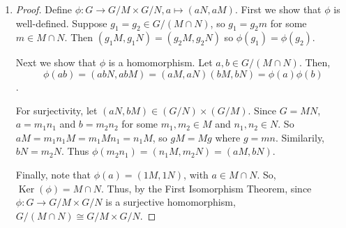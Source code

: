 \documentclass[11pt, letterpaper]{article}
\begin{document}
\begin{enumerate}
\begin{proof}
    we have $\vert HM = k \vert K \vert$ for some positive integer $k$, so either $\vert G : HM \vert = p$ or $\vert G : HM \vert = 1$. If it is $p$ then from 7, $\vert H = \vert H \cap M \vert$, so $H \leq M$. If instead it is $1$, then $\vert HM \vert = \vert G \vert$, so $HM = G$ and $\vert HM \vert = p \vert M \vert$. So
    $
    \vert HM \vert = \vert H : H \cap M \vert \vert K \vert
    $
    and $\vert H : H \cap M \vert = p$.
  \end{proof}

  \item \begin{proof}
    Define $\phi: G \to G/M \times G/N, a \mapsto (aN, aM)$. First we show that $\phi$ is well-defined. Suppose $g_1 = g_2 \in G/(M \cap N)$, so $g_1 = g_2m$ for some $m \in M \cap N$. Then $(g_1M, g_1N) = (g_2M, g_2N)$ so $\phi(g_1) = \phi(g_2)$.

    Next we show that $\phi$ is a homomorphism. Let $a, b \in G/(M \cap N)$. Then,
    $$
    \phi(ab) = (abN, abM) = (aM, aN)(bM, bN) = \phi(a)\phi(b)
    $$.

    For surjectivity, let $(aN, bM) \in (G/N) \times (G/M)$. Since $G = MN$, $a = m_1n_1$ and $b = m_2n_2$ for some $m_1, m_2 \in M$ and $n_1, n_2 \in N$. So $aM = m_1n_1M = m_1Mn_1 = n_1M$, so $gM = Mg$ where $g = mn$. Similarily, $bN = m_2N$. Thus $\phi(m_2n_1) = (n_1M, m_2N) = (aM, bN)$.

    Finally, note that $\phi(a) = (1M, 1N)$, with $a \in M \cap N$. So, $\operatorname{Ker}(\phi) = M \cap N$. Thus, by the First Isomorphism Theorem, since $\phi: G \to G/M \times G/N$ is a surjective homomorphism, $G/(M \cap N) \cong G/M \times G/N$.
  \end{proof}
\end{enumerate}
\end{document}
